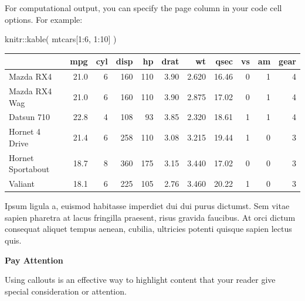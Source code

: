 \documentclass[
  brazilian,
  11pt,
  a4paper,
  open = right,
  twoside = true]{scrbook}
\newenvironment{Shaded}{\begin{snugshade}}{\end{snugshade}}
\newcommand{\DecValTok}[1]{\textcolor[rgb]{0.55,0.29,0.58}{#1}}
\newcommand{\FunctionTok}[1]{\textcolor[rgb]{1.00,0.23,0.00}{#1}}
\newcommand{\NormalTok}[1]{\textcolor[rgb]{0.10,0.10,0.10}{#1}}
\newcommand{\SpecialCharTok}[1]{\textcolor[rgb]{0.85,0.00,0.31}{#1}}
\begin{document}
For computational output, you can specify the page column in your code
cell options. For example:

\begin{Shaded}
\begin{Highlighting}[numbers=left,,]
\NormalTok{knitr}\SpecialCharTok{::}\FunctionTok{kable}\NormalTok{(}
\NormalTok{  mtcars[}\DecValTok{1}\SpecialCharTok{:}\DecValTok{6}\NormalTok{, }\DecValTok{1}\SpecialCharTok{:}\DecValTok{10}\NormalTok{]}
\NormalTok{)}
\end{Highlighting}
\end{Shaded}

\begin{table}

\begin{tabular}{lrrrrrrrrrr}
\toprule
 & mpg & cyl & disp & hp & drat & wt & qsec & vs & am & gear\\
\midrule
Mazda RX4 & 21.0 & 6 & 160 & 110 & 3.90 & 2.620 & 16.46 & 0 & 1 & 4\\
Mazda RX4
Wag & 21.0 & 6 & 160 & 110 & 3.90 & 2.875 & 17.02 & 0 & 1 & 4\\
Datsun 710 & 22.8 & 4 & 108 & 93 & 3.85 & 2.320 & 18.61 & 1 & 1 & 4\\
Hornet 4
Drive & 21.4 & 6 & 258 & 110 & 3.08 & 3.215 & 19.44 & 1 & 0 & 3\\
Hornet
Sportabout & 18.7 & 8 & 360 & 175 & 3.15 & 3.440 & 17.02 & 0 & 0 & 3\\
Valiant & 18.1 & 6 & 225 & 105 & 2.76 & 3.460 & 20.22 & 1 & 0 & 3\\
\bottomrule
\end{tabular}

\end{table}%

Ipsum ligula a, euismod habitasse imperdiet dui dui purus dictumst. Sem
vitae sapien pharetra at lacus fringilla praesent, risus gravida
faucibus. At orci dictum consequat aliquet tempus aenean, cubilia,
ultricies potenti quisque sapien lectus quis.

\begin{tcolorbox}[enhanced jigsaw, arc=.35mm, bottomrule=.15mm, breakable, colback=white, colframe=quarto-callout-note-color-frame, left=2mm, leftrule=.75mm, opacityback=0, rightrule=.15mm, toprule=.15mm]
\begin{minipage}[t]{5.5mm}
\textcolor{quarto-callout-note-color}{\faInfo}
\end{minipage}%
\begin{minipage}[t]{\textwidth - 5.5mm}

\vspace{-3mm}\textbf{Pay Attention}\vspace{3mm}

Using callouts is an effective way to highlight content that your reader
give special consideration or attention.

\end{minipage}%
\end{tcolorbox}
\end{document}
